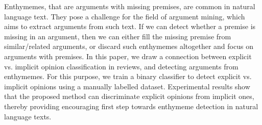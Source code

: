 Enthymemes, that are arguments with missing premises, are common in natural language text. They pose a challenge for the field of argument mining, which aims to extract arguments from such text. If we can detect whether a premise is missing in an argument, then we can either fill the missing premise from similar/related arguments, or discard such enthymemes altogether and focus on arguments with premises. In this paper, we draw a connection between explicit vs. implicit opinion classification in reviews, and detecting arguments from enthymemes. For this purpose, we train a binary classifier to detect explicit vs. implicit opinions using a manually labelled dataset. Experimental results show that the proposed method can discriminate explicit opinions from implicit ones, thereby providing encouraging first step towards enthymeme detection in natural language texts.
